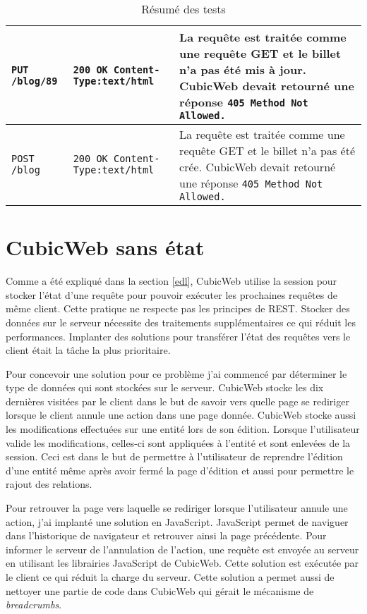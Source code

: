 \begin{table}[!h]
\begin{tabular}{|>{\raggedright\arraybackslash}m{}|m{}|m{}|}
\tt{\footnotesize PUT /blog/89} & \tt{\footnotesize 200 OK \newline
                Content-Type:text/html} & La requête est traitée comme une
                    requête GET et le billet n'a pas été mis à jour. CubicWeb
                    devait retourné une réponse \tt{405~Method Not Allowed}.
                    \\ \hline 

\tt{\footnotesize POST /blog} & \tt{\footnotesize 200 OK \newline
                Content-Type:text/html} & La requête est traitée comme une
                    requête GET et le billet n'a pas été crée. CubicWeb devait
                    retourné une réponse \tt{405~Method Not Allowed}.  \\
                \hline \end{tabular} \caption{Résumé des tests}
            \label{table:tests} \end{table}

\section{CubicWeb sans état} 
Comme a été expliqué dans la section \ref{edl}, CubicWeb utilise la session pour 
stocker l'état d'une requête pour pouvoir exécuter les prochaines requêtes de même 
client. Cette pratique ne respecte pas les principes de REST. Stocker des données 
sur le serveur nécessite des traitements supplémentaires ce qui réduit les 
performances. Implanter des solutions pour transférer l'état des requêtes vers le 
client était la tâche la plus prioritaire.

Pour concevoir une solution pour ce problème j'ai commencé par déterminer le
type de données qui sont stockées sur le serveur. CubicWeb stocke les dix
dernières  visitées par le client dans le but de savoir vers
quelle page se rediriger lorsque le client annule une action dans une page
donnée. CubicWeb stocke aussi les modifications effectuées sur une entité lors
de son édition. Lorsque l'utilisateur valide les modifications, celles-ci sont
appliquées à l'entité et sont enlevées de la session. Ceci est dans le but de
permettre à l'utilisateur de reprendre l'édition d'une entité même après avoir
fermé la page d'édition et aussi pour permettre le rajout des relations. 

Pour retrouver la page vers laquelle se rediriger lorsque l'utilisateur annule
une action, j'ai implanté une solution en JavaScript. JavaScript permet de
naviguer dans l'historique de navigateur et retrouver ainsi la page précédente.
Pour informer le serveur de l'annulation de l'action, une requête
 est envoyée au serveur en utilisant les librairies
JavaScript de CubicWeb. Cette solution est exécutée par le client ce qui réduit
la charge du serveur. Cette solution a permet aussi de nettoyer une partie de
code dans CubicWeb qui gérait le mécanisme de \textit{breadcrumbs}.


